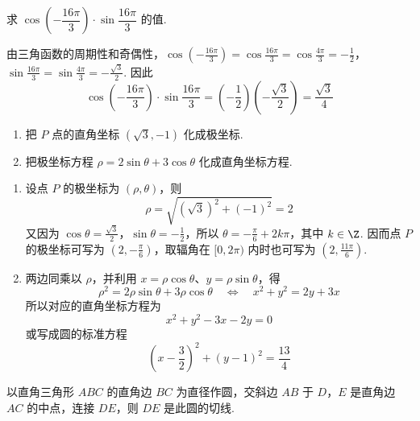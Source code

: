 \begin{problem}
求 \(\cos\left(-\dfrac{16\pi}{3}\right)\cdot\sin\dfrac{16\pi}{3}\) 的值.
\end{problem}

\begin{solution}
由三角函数的周期性和奇偶性，\(\cos\left(-\frac{16\pi}{3}\right)=\cos\frac{16\pi}{3}=\cos\frac{4\pi}{3}=-\frac12\)，\(\sin\frac{16\pi}{3}=\sin\frac{4\pi}{3}=-\frac{\sqrt{3}}2\). 因此
\[
\cos\left(-\frac{16\pi}{3}\right)\cdot\sin\frac{16\pi}{3}=\left(-\frac12\right)\left(-\frac{\sqrt{3}}2\right)=\frac{\sqrt{3}}4
\]
\end{solution}

\begin{problem}
\begin{enumerate}
    \item 把 \(P\) 点的直角坐标 \(\left(\sqrt{3},-1\right)\) 化成极坐标.

    \item 把极坐标方程 \(\rho=2\sin\theta+3\cos\theta\) 化成直角坐标方程.
\end{enumerate}
\end{problem}

\begin{solution}
\begin{enumerate}
    \item 设点 \(P\) 的极坐标为 \(\left(\rho,\theta\right)\)，则
    \[
    \rho=\sqrt{\left(\sqrt{3}\right)^2+(-1)^2}=2
    \]
    又因为 \(\cos\theta=\frac{\sqrt{3}}2\)，\(\sin\theta=-\frac12\)，所以 \(\theta=-\frac\pi6+2k\pi\)，其中 \(k\in\Z\). 因而点 \(P\) 的极坐标可写为 \(\left(2,-\frac\pi6\right)\)，取辐角在 \([0,2\pi)\) 内时也可写为 \(\left(2,\frac{11\pi}{6}\right)\).

    \item 两边同乘以 \(\rho\)，并利用 \(x=\rho\cos\theta\)、\(y=\rho\sin\theta\)，得
    \[
    \rho^2=2\rho\sin\theta+3\rho\cos\theta
    \quad\Longleftrightarrow\quad
    x^2+y^2=2y+3x
    \]
    所以对应的直角坐标方程为
    \[
    x^2+y^2-3x-2y=0
    \]
    或写成圆的标准方程
    \[
    \left(x-\frac32\right)^2+\left(y-1\right)^2=\frac{13}{4}
    \]
\end{enumerate}
\end{solution}

\begin{problem}
以直角三角形 \(ABC\) 的直角边 \(BC\) 为直径作圆，交斜边 \(AB\) 于 \(D\)，\(E\) 是直角边 \(AC\) 的中点，连接 \(DE\)，则 \(DE\) 是此圆的切线.
\end{problem}

